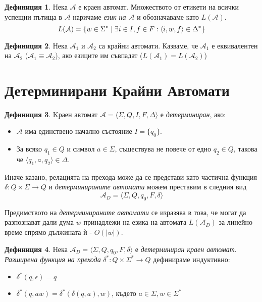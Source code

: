 \documentclass[12pt, oneside]{article}
\theoremstyle{definition}
\newtheorem{definition}{Дефиниция}[section]
\begin{document}
\begin{definition} 
	Нека \( \mathcal{A} \) е краен автомат. Множеството от етикети на всички успещни пътища в \( \mathcal{A} \) наричаме \emph{език на \( \mathcal{A} \)} и обозначаваме като \( L(\mathcal{A}) \). \[ L(\mathcal{A}) = \{ w \in \Sigma^* \hspace{0.1cm} | \hspace{0.1cm} \exists i \in I, f \in F : \langle i, w, f \rangle \in \Delta^* \} \]
\end{definition}

\begin{definition} 
	Нека \( \mathcal{A}_1 \) и \( \mathcal{A}_2 \) са крайни автомати. Казваме, че \( \mathcal{A}_1 \) е еквивалентен на \( \mathcal{A}_2 \) (\( \mathcal{A}_1 \equiv \mathcal{A}_2 \)), ако езиците им съвпадат (\( L(\mathcal{A}_1) = L(\mathcal{A}_2) \))
\end{definition}

\section{Детерминирани Крайни Автомати}

\begin{definition}
	Kраен автомат \( \mathcal{A} = \langle \Sigma, Q, I, F, \Delta \rangle \) е \emph{детерминиран}, ако:

	\begin{itemize}
		\item \( \mathcal{A} \) има единствено начално състояние \(I = \{q_0\}\).
		\item За всяко \( q_1 \in Q \) и символ \( a \in \Sigma \), съществува не повече от едно \( q_2 \in Q \), такова че \( \langle q_1, a, q_2 \rangle \in \Delta \).
	\end{itemize} 

	\noindent Иначе казано, релацията на прехода може да се представи като частична функция \( \delta: Q \times \Sigma \to Q \) и \emph{детерминираните автомати} можем преставим в следния вид \[ \mathcal{A}_D = \langle \Sigma, Q, q_0, F, \delta \rangle \]

	Предимството на \emph{детерминираните автомати} се изразява в това, че могат да разпознават дали дума \( w \) принадлежи на езика на автомата \( L(\mathcal{A}_D) \) за линейно време спрямо дължината ѝ - \( O(|w|) \).
\end{definition}

\begin{definition}
	Нека \( \mathcal{A}_D = \langle \Sigma, Q, q_0, F, \delta \rangle \) е \emph{детерминиран краен автомат}. \emph{Разширена функция на прехода} \( \delta^*: Q \times \Sigma^* \to Q \) дефинираме индуктивно:

	\begin{itemize}
		\item \( \delta^*(q, \epsilon) = q \)
		\item \( \delta^*(q, aw) = \delta^*(\delta(q, a), w) \), където \( a \in \Sigma, w \in \Sigma^* \)
	\end{itemize}
\end{definition}
\end{document}
